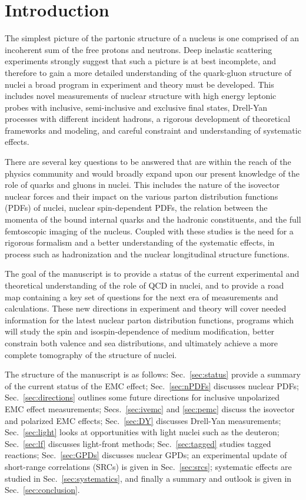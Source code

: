 \section{Introduction}

The simplest picture of the partonic structure of a nucleus is one comprised of an incoherent sum of the free protons and neutrons. Deep inelastic scattering experiments strongly suggest that such a picture is at best incomplete, and therefore to gain a more detailed understanding of the quark-gluon structure of nuclei a broad program in experiment and theory must be developed.  This includes novel measurements of nuclear structure with high energy leptonic probes with inclusive, semi-inclusive and exclusive final states, Drell-Yan processes with different incident hadrons, a rigorous development of theoretical frameworks and modeling, and careful constraint and understanding of systematic effects.

There are several key questions to be answered that are within the reach of the physics community and would broadly expand upon our present knowledge of the role of quarks and gluons in nuclei.  This includes the nature of the isovector nuclear forces and their impact on the various parton distribution functions (PDFs) of nuclei, nuclear spin-dependent PDFs, the relation between the momenta of the bound internal quarks and the hadronic constituents, and the full femtoscopic imaging of the nucleus.  Coupled with these studies is the need for a rigorous formalism and a better understanding of the systematic effects, in process such as hadronization and the nuclear longitudinal structure functions. 

The goal of the manuscript is to provide a status of the current experimental and theoretical understanding of the role of QCD in nuclei, and to provide a road map containing a key set of questions for the next era of measurements and calculations. These new directions in experiment and theory will cover needed information for the latest nuclear parton distribution functions, programs which will study the spin and isospin-dependence of medium modification, better constrain both valence and sea distributions, and ultimately achieve a more complete tomography of the structure of nuclei. 

The structure of the manuscript is as follows: Sec.~\ref{sec:status} provide a summary of the current status of the EMC effect; Sec.~\ref{sec:nPDFs} discusses nuclear PDFs; Sec.~\ref{sec:directions} outlines some future directions for inclusive unpolarized EMC effect measurements; Secs.~\ref{sec:ivemc} and \ref{sec:pemc} discuss the isovector and polarized EMC effects; Sec.~\ref{sec:DY} discusses Drell-Yan measurements; Sec.~\ref{sec:light} looks at opportunities with light nuclei such as the deuteron; Sec.~\ref{sec:lf} discusses light-front methods; Sec.~\ref{sec:tagged} studies tagged reactions; Sec.~\ref{sec:GPDs} discusses nuclear GPDs; an experimental update of short-range correlations (SRCs) is given in Sec.~\ref{sec:srcs}; systematic effects are studied in Sec.~\ref{sec:systematics}, and finally a summary and outlook is given in Sec.~\ref{sec:conclusion}.
